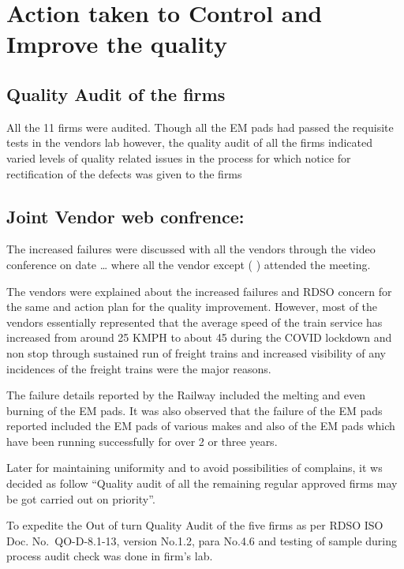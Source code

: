 \documentclass[nofonts,]{tufte-book}
\begin{document}
\hypertarget{action-taken-to-control-and-improve-the-quality}{%
\chapter{Action taken to Control and Improve the
quality}\label{action-taken-to-control-and-improve-the-quality}}

\hypertarget{quality-audit-of-the-firms}{%
\section{Quality Audit of the firms}\label{quality-audit-of-the-firms}}

All the 11 firms were audited. Though all the EM pads had passed the
requisite tests in the vendors lab however, the quality audit of all the
firms indicated varied levels of quality related issues in the process
for which notice for rectification of the defects was given to the firms

\hypertarget{joint-vendor-web-confrence}{%
\section{Joint Vendor web confrence:}\label{joint-vendor-web-confrence}}

The increased failures were discussed with all the vendors through the
video conference on date \ldots{} where all the vendor except ( )
attended the meeting.

The vendors were explained about the increased failures and RDSO concern
for the same and action plan for the quality improvement. However, most
of the vendors essentially represented that the average speed of the
train service has increased from around 25 KMPH to about 45 during the
COVID lockdown and non stop through sustained run of freight trains and
increased visibility of any incidences of the freight trains were the
major reasons.

The failure details reported by the Railway included the melting and
even burning of the EM pads. It was also observed that the failure of
the EM pads reported included the EM pads of various makes and also of
the EM pads which have been running successfully for over 2 or three
years.

Later for maintaining uniformity and to avoid possibilities of
complains, it ws decided as follow ``Quality audit of all the remaining
regular approved firms may be got carried out on priority''.

To expedite the Out of turn Quality Audit of the five firms as per RDSO
ISO Doc. No.~QO-D-8.1-13, version No.1.2, para No.4.6 and testing of
sample during process audit check was done in firm's lab.
\end{document}
